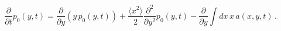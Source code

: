 \begin{equation}
\frac{\partial}{\partial t} p_0(y,t) = 
\frac{\partial}{\partial y} \left(y\, p_0(y,t)\right) +
\frac{\langle x^2\rangle}{2} \frac{\partial^2}{\partial y^2}p_0(y,t) -
\frac{\partial}{\partial y} \int dx\, x\, a(x,y,t) \, .
\label{eq16}
\end{equation}

